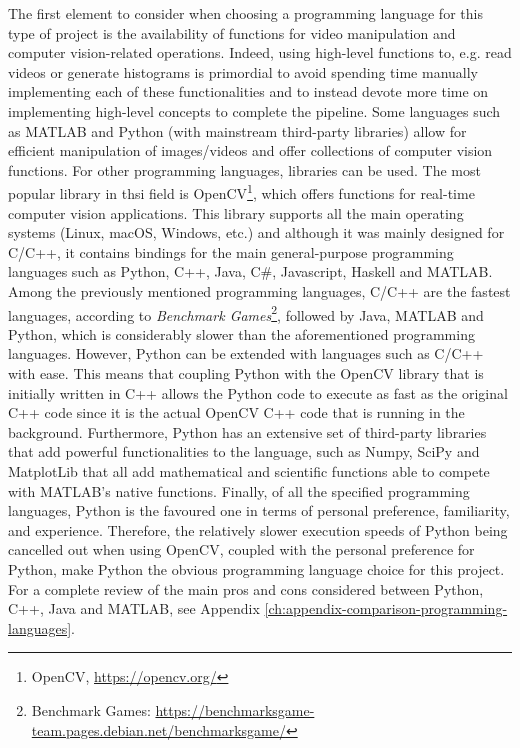 The first element to consider when choosing a programming language for this type of project is the availability of functions for video manipulation and computer vision-related operations. Indeed, using high-level functions to, e.g. read videos or generate histograms is primordial to avoid spending time manually implementing each of these functionalities and to instead devote more time on implementing high-level concepts to complete the pipeline. Some languages such as MATLAB and Python (with mainstream third-party libraries) allow for efficient manipulation of images/videos and offer collections of computer vision functions. For other programming languages, libraries can be used. The most popular library in thsi field is OpenCV\footnote{OpenCV, \url{https://opencv.org/}}, which offers functions for real-time computer vision applications. This library supports all the main operating systems (Linux, macOS, Windows, etc.) and although it was mainly designed for C/C++, it contains bindings for the main general-purpose programming languages such as Python, C++, Java, C\#, Javascript, Haskell and MATLAB.\\

Among the previously mentioned programming languages, C/C++ are the fastest languages,
according to \textit{Benchmark Games}\footnote{Benchmark Games: \url{https://benchmarksgame-team.pages.debian.net/benchmarksgame/}}, followed by Java, MATLAB and Python, which is considerably slower than the aforementioned programming languages. However, Python can be extended with languages such as C/C++ with ease. This means that coupling Python with the OpenCV library that is initially written in C++ allows the Python code to execute as fast as the original C++ code since it is the actual OpenCV C++ code that is running in the background. Furthermore, Python has an extensive set of third-party libraries that add powerful functionalities to the language, such as Numpy, SciPy and MatplotLib that all add mathematical and scientific functions able to compete with MATLAB's native functions. Finally, of all the specified programming languages, Python is the favoured one in terms of personal preference, familiarity, and experience. Therefore, the relatively slower execution speeds of Python being cancelled out when using OpenCV, coupled with the personal preference for Python, make Python the obvious programming language choice for this project. For a complete review of the main pros and cons considered between Python, C++, Java and MATLAB, see Appendix \ref{ch:appendix-comparison-programming-languages}.

